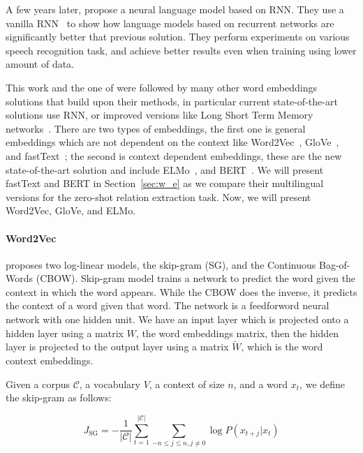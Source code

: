 A few years later, \citet{Mikolov2010RecurrentNN} propose a neural language model based on RNN. They use a vanilla RNN~\citep{elman1990finding} to show how language models based on recurrent networks are significantly better that previous solution. They perform experiments on various speech recognition task, and achieve better results even when training using lower amount of data.

This work and the one of \cite{bengio2000nnlm} were followed by many other word embeddings solutions that build upon their methods, in particular current state-of-the-art solutions use RNN, or improved versions like Long Short Term Memory networks~\citep{hochreiter1997long}. There are two types of embeddings, the first one is general embeddings which are not dependent on the context like Word2Vec~\citep{mikolov2013models,mikolov2013distributed}, GloVe~\citep{pennington2014glove}, and fastText~\citep{bojanowski2016enriching}; the second is context dependent embeddings, these are the new state-of-the-art solution and include ELMo~\citep{peters2018elmo}, and BERT~\citep{devlin2018bert}. We will present fastText and BERT in Section~\ref{sec:w_e} as we compare their multilingual versions for the zero-shot relation extraction task. Now, we will present Word2Vec, GloVe, and ELMo.


\paragraph{Word2Vec} \cite{mikolov2013models} proposes two log-linear models, the skip-gram (SG), and the Continuous Bag-of-Words (CBOW). Skip-gram model trains a network to predict the word given the context in which the word appears. While the CBOW does the inverse, it predicts the context of a word given that word. The network is a feedforword neural network with one hidden unit. We have an input layer which is projected onto a hidden layer using a matrix $W$, the word embeddings matrix, then the hidden layer is projected to the output layer using a matrix $\tilde{W}$, which is the word context embeddings. 

Given a corpus $\mathcal{C}$, a vocabulary $V$, a context of size $n$, and a word $x_t$, we define the skip-gram as follows:

\begin{equation}
J_{\mathrm{SG}}=-\frac{1}{|\mathcal{C}|} \sum_{t=1}^{|\mathcal{C}|} \sum_{-n \leq j \leq n, j \neq 0} \log P\left(x_{t+j} | x_{t}\right)
\end{equation}

